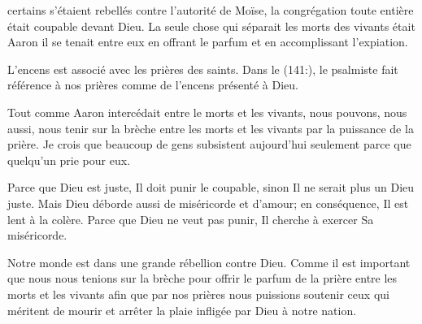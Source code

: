 


 certains s'étaient rebellés contre l'autorité de Moïse,
 la congrégation toute entière était coupable devant Dieu.
 La seule chose qui séparait les morts des vivants était Aaron
 \ocadr{}il se tenait entre eux en offrant le parfum
 et en accomplissant l'expiation.

L'encens est associé avec les prières des saints.
 Dans le (141:), le psalmiste
 fait référence à nos prières comme de l'encens présenté à Dieu.


Tout comme Aaron intercédait entre le morts et les vivants, nous pouvons,
 nous aussi, nous tenir sur la brèche entre les morts et les vivants
 par la puissance de la prière.
 Je crois que beaucoup de gens subsistent aujourd'hui
 seulement parce que quelqu'un prie pour eux.

Parce que Dieu est juste, Il doit punir le coupable,
 sinon Il ne serait plus un Dieu juste.
 Mais Dieu déborde aussi de miséricorde et d'amour;
 en conséquence, Il est lent à la colère.
 Parce que Dieu ne veut pas punir, Il cherche à exercer Sa miséricorde.

Notre monde est dans une grande rébellion contre Dieu.
 Comme il est important que nous nous tenions sur la brèche
 pour offrir le parfum de la prière entre les morts et les vivants
 \ocadr{}afin que par nos prières nous puissions soutenir
 ceux qui méritent de mourir et arrêter la plaie infligée
 par Dieu à notre nation. 

\dvrule





